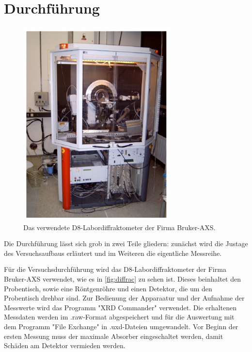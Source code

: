 \section{Durchführung}
\begin{figure}[tb]
  \centering
  \includegraphics[width=8cm,keepaspectratio]{diffraktometer.png}
  \caption{Das verwendete D8-Labordiffraktometer der Firma Bruker-AXS.}
  \label{fig:diffrac}
\end{figure}
Die Durchführung lässt sich grob in zwei Teile gliedern: zunächst wird die Justage des Versuchsaufbaus erläutert und im Weiteren die eigentliche Messreihe.

Für die Versuchsdurchführung wird das D8-Labordiffraktometer der Firma Bruker-AXS verwendet, wie es in \autoref{fig:diffrac} zu sehen ist. Dieses beinhaltet den Probentisch, sowie eine Röntgenröhre und einen Detektor, die um den Probentisch drehbar sind. Zur Bedienung der Apparaatur und der Aufnahme der Messwerte wird das Programm "XRD Commander" verwendet. Die erhaltenen Messdaten werden im .raw-Format abgespeichert und für die Auswertung mit dem Programm "File Exchange" in .uxd-Dateien umgewandelt. Vor Beginn der ersten Messung muss der maximale Absorber eingeschaltet werden, damit Schäden am Detektor vermieden werden.

